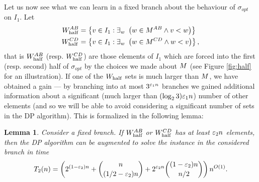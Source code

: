 \documentclass{article}
\newtheorem{lemma}[theorem]{Lemma}
\theoremstyle{definition}
\begin{document}
Let us now see what we can learn in a fixed branch about the behaviour of $\sigma_{opt}$ on $I_1$.
Let 
\begin{align*}
W_{\mathrm{half}}^{AB} &= \left\{v \in I_1: \exists_w\ \left(w \in M^{AB} \wedge v < w\right)\right\} \\
W_{\mathrm{half}}^{CD} &= \left\{v \in I_1: \exists_w\ \left(w \in M^{CD} \wedge w < v\right)\right\},
\end{align*}
that is $W_{\mathrm{half}}^{AB}$ (resp. $W_{\mathrm{half}}^{CD}$) are those elements of $I_1$ which are forced into the first (resp. second) half of $\sigma_{opt}$
by the choices we made about $M$ (see Figure \ref{fig:half} for an illustration).
If one of the $W_{\mathrm{half}}$ sets is much larger than $M$, we have obtained a gain --- by branching into at most $3^{\varepsilon_1 n}$ branches we gained
additional information about a significant (much larger than $(\log_23) \varepsilon_1 n$) number of other elements (and so we will be able to avoid considering a significant number of
sets in the DP algorithm).
This is formalized in the following lemma:

\begin{lemma}\label{lem:half}
Consider a fixed branch.
If $W_{\mathrm{half}}^{AB}$ or $W_{\mathrm{half}}^{CD}$ has at least $\varepsilon_2 n$ elements, then the DP algorithm can be augmented to solve the instance in the considered branch in time
$$T_2(n) = \left( 2^{(1-\varepsilon_2)n} + \binom{n}{(1/2 - \varepsilon_2)n} + 2^{\varepsilon_2 n}\binom{(1-\varepsilon_2)n}{n/2} \right) n^{O(1)}.$$
\end{lemma}
\end{document}
